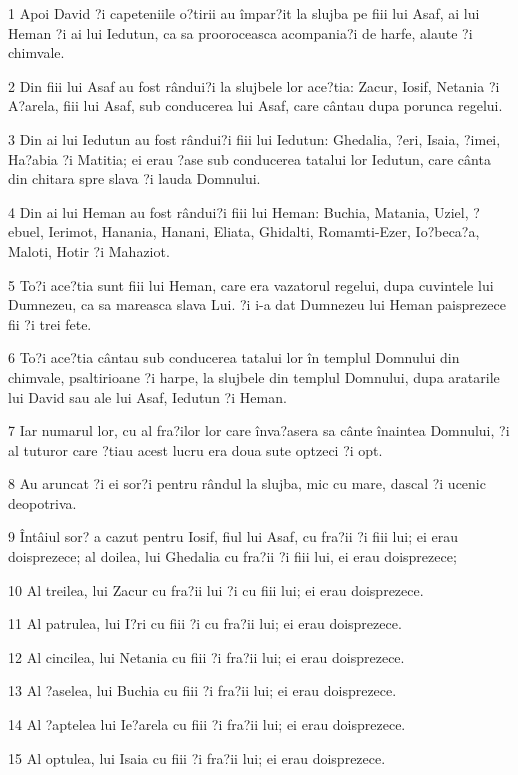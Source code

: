 \par 1 Apoi David ?i capeteniile o?tirii au împar?it la slujba pe fiii lui Asaf, ai lui Heman ?i ai lui Iedutun, ca sa prooroceasca acompania?i de harfe, alaute ?i chimvale.
\par 2 Din fiii lui Asaf au fost rândui?i la slujbele lor ace?tia: Zacur, Iosif, Netania ?i A?arela, fiii lui Asaf, sub conducerea lui Asaf, care cântau dupa porunca regelui.
\par 3 Din ai lui Iedutun au fost rândui?i fiii lui Iedutun: Ghedalia, ?eri, Isaia, ?imei, Ha?abia ?i Matitia; ei erau ?ase sub conducerea tatalui lor Iedutun, care cânta din chitara spre slava ?i lauda Domnului.
\par 4 Din ai lui Heman au fost rândui?i fiii lui Heman: Buchia, Matania, Uziel, ?ebuel, Ierimot, Hanania, Hanani, Eliata, Ghidalti, Romamti-Ezer, Io?beca?a, Maloti, Hotir ?i Mahaziot.
\par 5 To?i ace?tia sunt fiii lui Heman, care era vazatorul regelui, dupa cuvintele lui Dumnezeu, ca sa mareasca slava Lui. ?i i-a dat Dumnezeu lui Heman paisprezece fii ?i trei fete.
\par 6 To?i ace?tia cântau sub conducerea tatalui lor în templul Domnului din chimvale, psaltirioane ?i harpe, la slujbele din templul Domnului, dupa aratarile lui David sau ale lui Asaf, Iedutun ?i Heman.
\par 7 Iar numarul lor, cu al fra?ilor lor care înva?asera sa cânte înaintea Domnului, ?i al tuturor care ?tiau acest lucru era doua sute optzeci ?i opt.
\par 8 Au aruncat ?i ei sor?i pentru rândul la slujba, mic cu mare, dascal ?i ucenic deopotriva.
\par 9 Întâiul sor? a cazut pentru Iosif, fiul lui Asaf, cu fra?ii ?i fiii lui; ei erau doisprezece; al doilea, lui Ghedalia cu fra?ii ?i fiii lui, ei erau doisprezece;
\par 10 Al treilea, lui Zacur cu fra?ii lui ?i cu fiii lui; ei erau doisprezece.
\par 11 Al patrulea, lui I?ri cu fiii ?i cu fra?ii lui; ei erau doisprezece.
\par 12 Al cincilea, lui Netania cu fiii ?i fra?ii lui; ei erau doisprezece.
\par 13 Al ?aselea, lui Buchia cu fiii ?i fra?ii lui; ei erau doisprezece.
\par 14 Al ?aptelea lui Ie?arela cu fiii ?i fra?ii lui; ei erau doisprezece.
\par 15 Al optulea, lui Isaia cu fiii ?i fra?ii lui; ei erau doisprezece.
